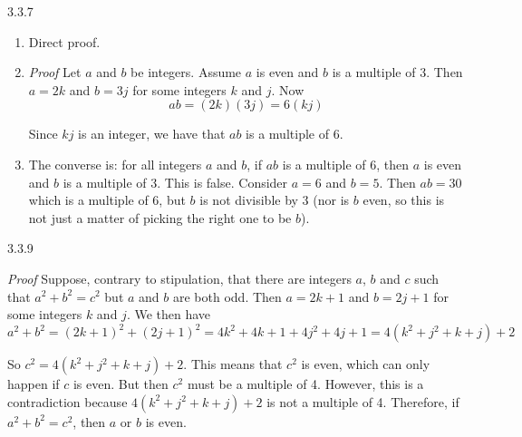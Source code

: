 \documentclass[11pt,]{book}
\makeatletter
\theoremstyle{ptxplainnotitle}
\theoremstyle{ptxplaintitle}
\renewcommand*{\proofname}{Proof}
\renewenvironment{proof}[1][\proofname]{\par
  \pushQED{\qed}%
  \normalfont \topsep6\p@\@plus6\p@\relax
  \trivlist
  \item\relax
    {\itshape
    #1\@addpunct{.}}\hspace\labelsep\ignorespaces
}{%
  \popQED\endtrivlist\@endpefalse
}
\theoremstyle{ptxdefinitionnotitle}
\theoremstyle{ptxdefinitiontitle}
\theoremstyle{ptxdefinitionnotitle}
\theoremstyle{ptxdefinitiontitle}
\theoremstyle{ptxdefinitionnotitle}
\theoremstyle{ptxdefinitiontitle}
\theoremstyle{ptxdefinitiontitlenonumber}
\theoremstyle{ptxdefinitiontitlenonumber}
\numberwithin{equation}{chapter}
\makeatother
\begin{document}
\begin{divisionexercise}{3.3.7}
\textbf{}\leavevmode%
\begin{enumerate}[label=(\alph*)]
\item\hypertarget{li-1151}{}\hypertarget{p-2415}{}%
Direct proof. \begin{proof}\hypertarget{proof-34}{}
\hypertarget{p-2416}{}%
Let \(a\) and \(b\) be integers. Assume \(a\) is even and \(b\) is a multiple of 3. Then \(a = 2k\) and \(b = 3j\) for some integers \(k\) and \(j\). Now%
\begin{equation*}
ab = (2k)(3j) = 6(kj)
\end{equation*}
%
\par
\hypertarget{p-2417}{}%
Since \(kj\) is an integer, we have that \(ab\) is a multiple of 6.%
\end{proof}
%
\item\hypertarget{li-1152}{}\hypertarget{p-2418}{}%
The converse is: for all integers \(a\) and \(b\), if \(ab\) is a multiple of 6, then \(a\) is even and \(b\) is a multiple of 3. This is false. Consider \(a = 6\) and \(b = 5\). Then \(ab = 30\) which is a multiple of 6, but \(b\) is not divisible by 3 (nor is \(b\) even, so this is not just a matter of picking the right one to be \(b\)).%
\end{enumerate}
\end{divisionexercise}%
\begin{divisionexercise}{3.3.9}
\textbf{}\begin{proof}\hypertarget{proof-35}{}
\hypertarget{p-2421}{}%
Suppose, contrary to stipulation, that there are integers \(a\), \(b\) and \(c\) such that \(a^2 + b^2 = c^2\) but \(a\) and \(b\) are both odd. Then \(a = 2k+1\) and \(b = 2j + 1\) for some integers \(k\) and \(j\). We then have%
\begin{equation*}
a^2 + b^2 = (2k+1)^2 + (2j+1)^2 = 4k^2 + 4k + 1 + 4j^2 + 4j + 1 = 4(k^2 + j^2 + k + j) + 2
\end{equation*}
%
\par
\hypertarget{p-2422}{}%
So \(c^2 = 4(k^2 + j^2 + k + j) + 2\). This means that \(c^2\) is even, which can only happen if \(c\) is even. But then \(c^2\) must be a multiple of 4. However, this is a contradiction because \(4(k^2 + j^2 + k + j) + 2\) is not a multiple of 4.  Therefore, if \(a^2 + b^2 = c^2\), then \(a\) or \(b\) is even.%
\end{proof}
\end{divisionexercise}%
\end{document}
